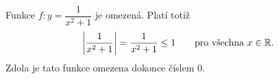 \wikitextrule
\begin{example}\label{MAI:exam023}
  Funkce $f:y=\dfrac{1}{x^2+1}$ je omezená. Platí totiž 
  \begin{equation*}
    \left|\frac{1}{x^2+1}\right|=\frac{1}{x^2+1}\leq1 \qquad \text{pro všechna }x\in\mathbb{R}.
  \end{equation*}
  Zdola je tato funkce omezena dokonce číslem $0$.  
\end{example}